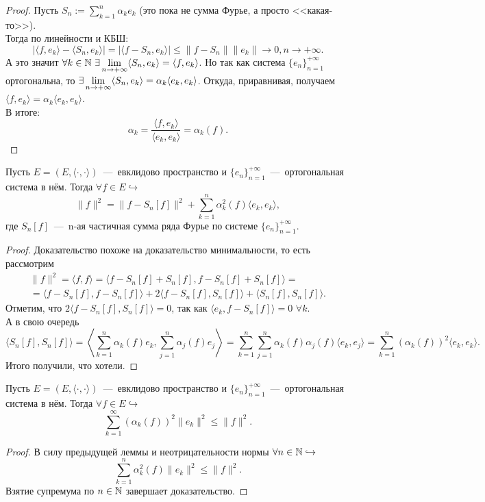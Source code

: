 \begin{proof}
    Пусть $S_n := \sum\limits_{k = 1}^n \alpha_k e_k$ (это пока не сумма Фурье, а просто <<какая-то>>).\\
    Тогда по линейности и КБШ:
    \[
        |\langle f, e_k \rangle - \langle S_n, e_k \rangle| = |\langle f - S_n, e_k \rangle| \leq \|f - S_n\| \|e_k\| \rightarrow 0, n \rightarrow +\infty.
    \]
    А это значит $\forall k \in \mathbb{N} \ \exists \lim\limits_{n \rightarrow +\infty} \langle S_n, e_k \rangle = \langle f, e_k \rangle$.
    Но так как система $\{e_n\}_{n = 1}^{+\infty}$ ортогональна, то $\exists \lim\limits_{n \rightarrow +\infty} \langle S_n, e_k \rangle = \alpha_k  \langle e_k, e_k \rangle$. Откуда, приравнивая, получаем $\langle f, e_k \rangle = \alpha_k  \langle e_k, e_k \rangle$.\\
    В итоге:
    \[
    \alpha_k = \frac{\langle f, e_k \rangle}{\langle e_k, e_k \rangle} = \alpha_k(f).
    \]
\end{proof}

\begin{lemma}
    Пусть $E = (E, \langle \cdot, \cdot \rangle)$~---~евклидово пространство и $\{e_n\}_{n = 1}^{+\infty}$~---~ортогональная система в нём.
    Тогда $\forall f \in E \hookrightarrow$
    \[
        \|f\|^2 = \|f - S_n[f]\|^2 + \sum\limits_{k = 1}^n \alpha_k^2(f)\langle e_k, e_k \rangle,
    \]
    где $S_n[f]$~---~n-ая частичная сумма ряда Фурье по системе $\{e_n\}_{n=1}^{+\infty}$.
\end{lemma}
\begin{proof}
    Доказательство похоже на доказательство минимальности, то есть рассмотрим
    \begin{multline*}
    \| f \|^2 = \langle f, f \rangle = \langle f - S_n[f] + S_n[f], f - S_n[f] + S_n[f]\rangle = \\ = \langle f - S_n[f], f - S_n[f]  \rangle + 2 \langle f - S_n[f], S_n[f]  \rangle + \langle S_n[f], S_n[f]\rangle.
    \end{multline*}
    Отметим, что $2 \langle f - S_n[f], S_n[f]  \rangle = 0$, так как $\langle e_k, f - S_n[f] \rangle = 0$ $\forall k$.\\
    А в свою очередь $$\langle S_n[f], S_n[f] \rangle = \left\langle \sum_{k = 1}^{n} \alpha_k (f) e_k, \sum_{j = 1}^{n} \alpha_j (f) e_j\right\rangle = \sum_{k = 1}^{n} \sum_{j = 1}^{n} \alpha_k (f) \alpha_j (f) \langle e_k, e_j \rangle = \sum_{k = 1}^n \left( \alpha_k (f)\right)^2 \langle e_k, e_k \rangle.$$
    Итого получили, что хотели.
\end{proof}
\begin{corollary}
    Пусть $E = (E, \langle \cdot, \cdot \rangle)$~---~евклидово пространство и $\{e_n\}_{n = 1}^{+\infty}$~---~ортогональная система в нём.
    Тогда $\forall f \in E \hookrightarrow$
\[
\sum_{k=1}^\infty \left( \alpha_k (f) \right)^2 \| e_k\|^2 \leq \|f\|^2.
\]
\end{corollary}
\begin{proof}
    В силу предыдущей леммы и неотрицательности нормы $\forall n \in \mathbb{N} \hookrightarrow$
    \[
        \sum\limits_{k = 1}^n \alpha_k^2(f)\|e_k\|^2 \leq \|f\|^2.
    \]
    Взятие супремума по $n \in \mathbb{N}$ завершает доказательство.
\end{proof}

